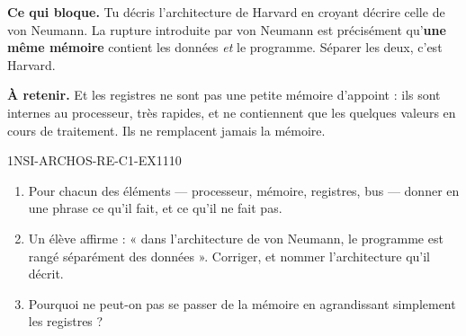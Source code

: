 

\textbf{Ce qui bloque.} Tu décris l'architecture de Harvard en croyant décrire celle de von
Neumann. La rupture introduite par von Neumann est précisément qu'\textbf{une même mémoire}
contient les données \emph{et} le programme. Séparer les deux, c'est Harvard.

\textbf{À retenir.} Et les registres ne sont pas une petite mémoire d'appoint : ils sont
internes au processeur, très rapides, et ne contiennent que les quelques valeurs en cours de
traitement. Ils ne remplacent jamais la mémoire.

\begin{exercice}{1NSI-ARCHOS-RE-C1-EX1}{1}{10}
\begin{enumerate}
  \item Pour chacun des éléments — processeur, mémoire, registres, bus — donner en une phrase
        ce qu'il fait, et ce qu'il ne fait pas.
  \item Un élève affirme : « dans l'architecture de von Neumann, le programme est rangé
        séparément des données ». Corriger, et nommer l'architecture qu'il décrit.
  \item Pourquoi ne peut-on pas se passer de la mémoire en agrandissant simplement les
        registres ?
\end{enumerate}
\end{exercice}

